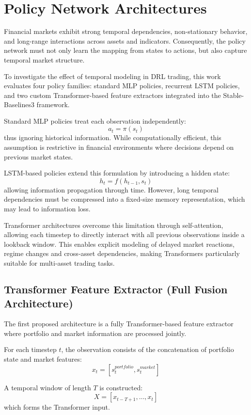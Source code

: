 \section{Policy Network Architectures}

Financial markets exhibit strong temporal dependencies, non-stationary behavior, and 
long-range interactions across assets and indicators. Consequently, the policy network
must not only learn the mapping from states to actions, but also capture temporal market
structure.

To investigate the effect of temporal modeling in DRL trading, this work evaluates four
policy families: standard MLP policies, recurrent LSTM policies, and two custom 
Transformer-based feature extractors integrated into the Stable-Baselines3 framework.

Standard MLP policies treat each observation independently:
\[
a_t = \pi(s_t)
\]
thus ignoring historical information. While computationally efficient, this assumption
is restrictive in financial environments where decisions depend on previous market states.

LSTM-based policies extend this formulation by introducing a hidden state:
\[
h_t = f(h_{t-1}, s_t)
\]
allowing information propagation through time. However, long temporal dependencies must
be compressed into a fixed-size memory representation, which may lead to information loss.

Transformer architectures overcome this limitation through self-attention, allowing each
timestep to directly interact with all previous observations inside a lookback window.
This enables explicit modeling of delayed market reactions, regime changes and cross-asset
dependencies, making Transformers particularly suitable for multi-asset trading tasks.

\subsection{Transformer Feature Extractor (Full Fusion Architecture)}

The first proposed architecture is a fully Transformer-based feature extractor where
portfolio and market information are processed jointly.

For each timestep $t$, the observation consists of the concatenation of portfolio state
and market features:
\[
x_t =
[s_t^{portfolio}, s_t^{market}]
\]

A temporal window of length $T$ is constructed:
\[
X =
[x_{t-T+1}, \dots, x_t]
\]
which forms the Transformer input.

